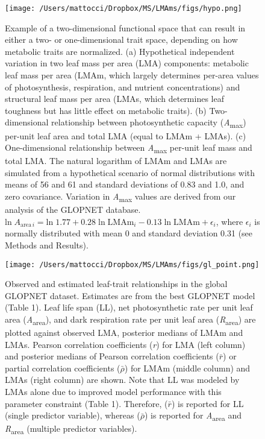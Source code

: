 \documentclass[
  12pt,
  letterpaper,
  DIV=11,
  numbers=noendperiod]{scrartcl}
\begin{document}
\newpage

\begin{figure}

{\centering \texttt{[image: /Users/mattocci/Dropbox/MS/LMAms/figs/hypo.png]}

}

\caption{\label{fig-hypo}Example of a two-dimensional functional space
that can result in either a two- or one-dimensional trait space,
depending on how metabolic traits are normalized. (a) Hypothetical
independent variation in two leaf mass per area (LMA) components:
metabolic leaf mass per area (LMAm, which largely determines per-area
values of photosynthesis, respiration, and nutrient concentrations) and
structural leaf mass per area (LMAs, which determines leaf toughness but
has little effect on metabolic traits). (b) Two-dimensional relationship
between photosynthetic capacity (\emph{A}\textsubscript{max}) per-unit
leaf area and total LMA (equal to LMAm + LMAs). (c) One-dimensional
relationship between \emph{A}\textsubscript{max} per-unit leaf mass and
total LMA. The natural logarithm of LMAm and LMAs are simulated from a
hypothetical scenario of normal distributions with means of 56 and 61
and standard deviations of 0.83 and 1.0, and zero covariance. Variation
in \emph{A}\textsubscript{max} values are derived from our analysis of
the GLOPNET database.
\(\mathrm{ln\;} A_{\mathrm{area} \, i}= \mathrm{ln\;} 1.77 + 0.28 \; \mathrm{ln\; LMAm}_i -0.13 \; \mathrm{ln\; LMAm} + \epsilon_i\),
where \(\epsilon_i\) is normally distributed with mean 0 and standard
deviation 0.31 (see Methods and Results).}

\end{figure}

\begin{figure}

{\centering \texttt{[image: /Users/mattocci/Dropbox/MS/LMAms/figs/gl\_point.png]}

}

\caption{\label{fig-gl_point}Observed and estimated leaf-trait
relationships in the global GLOPNET dataset. Estimates are from the best
GLOPNET model (Table 1). Leaf life span (LL), net photosynthetic rate
per unit leaf area (\emph{A}\textsubscript{area}), and dark respiration
rate per unit leaf area (\emph{R}\textsubscript{area}) are plotted
against observed LMA, posterior medians of LMAm and LMAs. Pearson
correlation coefficients (\emph{r}) for LMA (left column) and posterior
medians of Pearson correlation coefficients (\(\bar{r}\)) or partial
correlation coefficients (\(\bar{\rho}\)) for LMAm (middle column) and
LMAs (right column) are shown. Note that LL was modeled by LMAs alone
due to improved model performance with this parameter constraint (Table
1). Therefore, (\(\bar{r}\)) is reported for LL (single predictor
variable), whereas (\(\bar{\rho}\)) is reported for
\emph{A}\textsubscript{area} and \emph{R}\textsubscript{area} (multiple
predictor variables).}

\end{figure}
\end{document}
